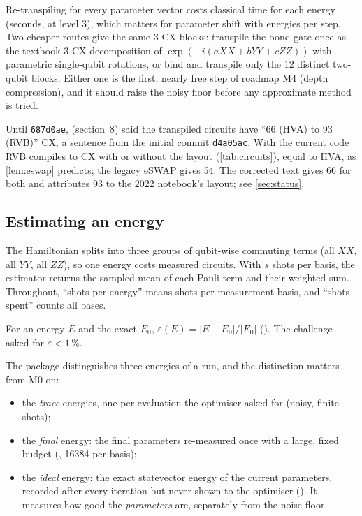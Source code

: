\begin{rem}
  Re-transpiling for every parameter vector costs classical time for each energy (seconds, at
  level 3), which matters for parameter shift with \VPsEnergiesHva{} energies per step. Two cheaper
  routes give the same 3-CX blocks: transpile the bond gate once as the textbook 3-CX
  decomposition of $\exp(-i(aXX+bYY+cZZ))$ with parametric single-qubit rotations, or bind and
  transpile only the 12 distinct two-qubit blocks. Either one is the first, nearly free step of
  roadmap M4 (depth compression), and it should raise the noisy floor before any approximate
  method is tried.
\end{rem}

\begin{rem}
  Until \texttt{687d0ae},  (section~8) said the transpiled circuits have
  ``66 (HVA) to 93 (RVB)'' CX, a sentence from the initial commit \texttt{d4a05ac}. With the
  current code RVB compiles to \VCxRvb{} CX with or without the layout (\cref{tab:circuits}),
  equal to HVA, as \cref{lem:eswap} predicts; the legacy eSWAP gives 54. The corrected text
  gives 66 for both and attributes 93 to the 2022 notebook's layout; see \cref{sec:status}.
\end{rem}

\subsection{Estimating an energy}

The Hamiltonian splits into three groups of qubit-wise commuting terms (all $XX$, all $YY$, all
$ZZ$), so one energy costs \VMeasGroups{} measured circuits. With $s$ shots per basis, the
estimator returns the sampled mean of each Pauli term and their weighted sum. Throughout,
``shots per energy'' means shots per measurement basis, and ``shots spent'' counts all bases.

\begin{dfn}
  For an energy $E$ and the exact $E_0$, $\varepsilon(E)=|E-E_0|/|E_0|$ ().
  The challenge asked for $\varepsilon<1\,\%$.
\end{dfn}

The package distinguishes three energies of a run, and the distinction matters from M0 on:
\begin{itemize}
  \item the \emph{trace} energies, one per evaluation the optimiser asked for (noisy, finite shots);
  \item the \emph{final} energy: the final parameters re-measured once with a large, fixed budget
    (, 16384 per basis);
  \item the \emph{ideal} energy: the exact statevector energy of the current parameters, recorded
    after every iteration but never shown to the optimiser (). It measures
    how good the \emph{parameters} are, separately from the noise floor.
\end{itemize}
